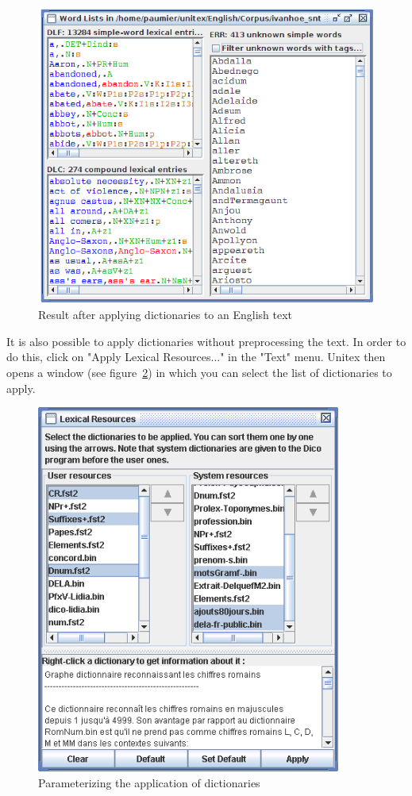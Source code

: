 \begin{figure}[!ht]
\begin{center}
\includegraphics[width=12cm]{resources/img/fig2-13.png}
\caption{Result after applying dictionaries to an English text\label{fig-Dico-application-results}}
\end{center}
\end{figure}

\bigskip
\noindent It is also possible to apply dictionaries without preprocessing the text. In
order to do this, click on "Apply Lexical Resources..." in the "Text" menu.
Unitex then opens a window (see
figure~\ref{fig-Dico-configuration}) in which you can select
the list of dictionaries to apply.

\begin{figure}[!ht]
\begin{center}
\includegraphics[width=10cm]{resources/img/fig2-14.png}
\caption{Parameterizing the application of dictionaries\label{fig-Dico-configuration}}
\end{center}
\end{figure}

